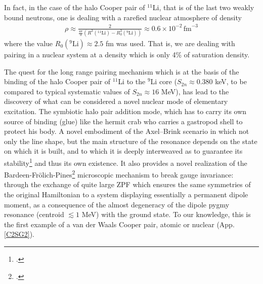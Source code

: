 \begin{subappendices}
In fact, in the case of the halo Cooper pair of $^{11}$Li, that is of the last two weakly bound neutrons, one is dealing with a rarefied nuclear atmosphere of density
\begin{align}\label{eq5App3E}
\rho\approx\frac{2}{\frac{4\pi}{3}(R^3(^{11}\text{Li})-R_0^3(^{9}\text{Li}))}\approx 0.6\times 10^{-2}\,\text{fm}^{-3}
\end{align}
where the value $R_0(^9\text{Li})\approx 2.5$ fm was used. That is, we are dealing with pairing in a nuclear system at a density which is only 4\% of saturation density.

The quest for the long range pairing mechanism which is at the basis of the binding of the halo Cooper pair of $^{11}$Li to the $^9$Li core ($S_{2n}\approx0.380$ keV, to be compared to typical systematic values of $S_{2n}\approx 16$ MeV), has lead to the discovery of what can be considered a novel nuclear mode of elementary excitation. The symbiotic halo pair addition mode, which has to carry its own source of binding (glue) like the hermit crab who carries a gastropod shell to protect his body. A novel embodiment of the Axel--Brink scenario in which not only the line shape, but the main structure of the resonance depends on the state on which it is built, and to which it is deeply interweaved as to guarantee its stability\footnote{\cite{Axel:62,Brink:55}.} and thus its own existence. It also provides a novel realization of the Bardeen-Fr\"olich-Pines\footnote{\cite{Bardeen:55,Frohlich:52}.} microscopic mechanism to break gauge invariance: through the exchange of quite large ZPF which ensures the same symmetries of the original Hamiltonian to a system displaying essentially a permanent dipole moment, as a consequence of the almost degeneracy of the  dipole pygmy resonance (centroid $\lesssim 1$ MeV) with the ground state. To our knowledge, this is the first example of a van der Waals Cooper pair, atomic or nuclear (App. \ref{C2SG2}).



\end{subappendices}
